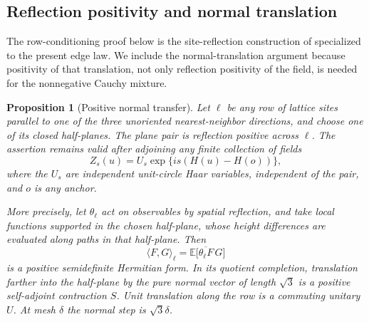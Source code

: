 \documentclass[11pt]{article}
\newtheorem{proposition}[theorem]{Proposition}
\theoremstyle{definition}
\theoremstyle{remark}
\numberwithin{equation}{section}
\begin{document}
\subsection{Reflection positivity and normal translation}

The row-conditioning proof below is the site-reflection construction
of \cite[Section~3, example~5]{FILS1978} specialized to the present edge law.
We include the normal-translation argument because positivity of that
translation, not only reflection positivity of the field, is needed
for the nonnegative Cauchy mixture.

\begin{proposition}[Positive normal transfer]
\label{prop:reflection-transfer}
Let $\ell$ be any row of lattice sites parallel to one of the three
unoriented nearest-neighbor directions, and choose one of its closed
half-planes.  The plane pair is reflection positive across $\ell$.
The assertion remains valid after adjoining any finite collection of fields
\begin{equation}
 \label{plane:eq:phases}
 Z_s(u)=U_s\exp\{is(H(u)-H(o))\},
\end{equation}
where the $U_s$ are independent unit-circle Haar variables, independent of
the pair, and $o$ is any anchor.

More precisely, let $\theta_\ell$ act on observables by spatial reflection,
and take local functions supported in the chosen half-plane, whose
height differences are evaluated along paths in that half-plane.  Then
\[
 \langle F,G\rangle_\ell
     =\mathbb E\big[\overline{\theta_\ell F}\,G\big]
\]
is a positive semidefinite Hermitian form.  In its quotient completion,
translation farther into the half-plane by the pure normal vector of
length $\sqrt3$ is a positive self-adjoint contraction $S$.  Unit
translation along the row is a commuting unitary $U$.  At mesh $\delta$
the normal step is $\sqrt3\delta$.
\end{proposition}
\end{document}
